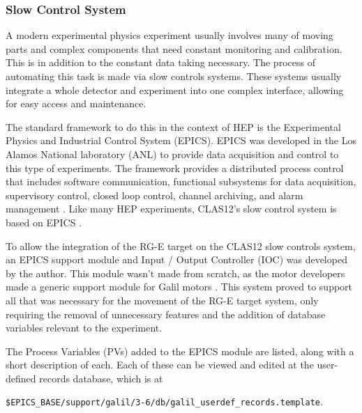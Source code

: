 \subsubsection{Slow Control System} \label{sssec::slowcontrolsystem}
    A modern experimental physics experiment usually involves many of moving parts and complex components that need constant monitoring and calibration.
    This is in addition to the constant data taking necessary.
    The process of automating this task is made via slow controls systems.
    These systems usually integrate a whole detector and experiment into one complex interface, allowing for easy access and maintenance.

    The standard framework to do this in the context of HEP is the Experimental Physics and Industrial Control System (EPICS).
    EPICS was developed in the Los Alamos National laboratory (ANL) to provide data acquisition and control to this type of experiments.
    The framework provides a distributed process control that includes software communication, functional subsystems for data acquisition, supervisory control, closed loop control, channel archiving, and alarm management \cite{dalesio1991}.
    Like many HEP experiments, CLAS12's slow control system is based on EPICS \cite{boyarinov2020}.

    To allow the integration of the RG-E target on the CLAS12 slow controls system, an EPICS support module and Input / Output Controller (IOC) was developed by the author.
    This module wasn't made from scratch, as the motor developers made a generic support module for Galil motors \cite{farnswort2009}.
    This system proved to support all that was necessary for the movement of the RG-E target system, only requiring the removal of unnecessary features and the addition of database variables relevant to the experiment.

    The Process Variables (PVs) added to the EPICS module are listed, along with a short description of each.
    Each of these can be viewed and edited at the user-defined records database, which is at

    \begin{center}
        \texttt{\$EPICS\_BASE/support/galil/3-6/db/galil\_userdef\_records.template}.
    \end{center}

